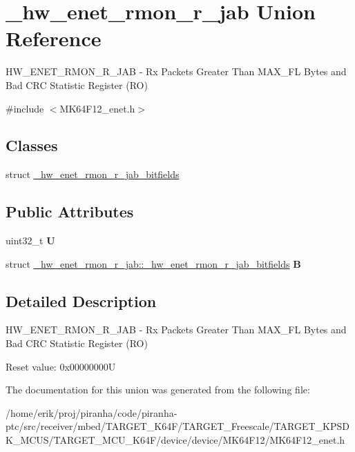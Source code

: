 \hypertarget{union__hw__enet__rmon__r__jab}{}\section{\+\_\+hw\+\_\+enet\+\_\+rmon\+\_\+r\+\_\+jab Union Reference}
\label{union__hw__enet__rmon__r__jab}


H\+W\+\_\+\+E\+N\+E\+T\+\_\+\+R\+M\+O\+N\+\_\+\+R\+\_\+\+J\+AB -\/ Rx Packets Greater Than M\+A\+X\+\_\+\+FL Bytes and Bad C\+RC Statistic Register (RO)  




{\ttfamily \#include $<$M\+K64\+F12\+\_\+enet.\+h$>$}

\subsection*{Classes}
\begin{DoxyCompactItemize}
\item 
struct \hyperlink{struct__hw__enet__rmon__r__jab_1_1__hw__enet__rmon__r__jab__bitfields}{\+\_\+hw\+\_\+enet\+\_\+rmon\+\_\+r\+\_\+jab\+\_\+bitfields}
\end{DoxyCompactItemize}
\subsection*{Public Attributes}
\begin{DoxyCompactItemize}
\item 
uint32\+\_\+t {\bfseries U}\hypertarget{union__hw__enet__rmon__r__jab_aba3c8ce7e114f7db6b4c817150dec4f1}{}\label{union__hw__enet__rmon__r__jab_aba3c8ce7e114f7db6b4c817150dec4f1}

\item 
struct \hyperlink{struct__hw__enet__rmon__r__jab_1_1__hw__enet__rmon__r__jab__bitfields}{\+\_\+hw\+\_\+enet\+\_\+rmon\+\_\+r\+\_\+jab\+::\+\_\+hw\+\_\+enet\+\_\+rmon\+\_\+r\+\_\+jab\+\_\+bitfields} {\bfseries B}\hypertarget{union__hw__enet__rmon__r__jab_a198b484dd7e446a74b02dad780f7c876}{}\label{union__hw__enet__rmon__r__jab_a198b484dd7e446a74b02dad780f7c876}

\end{DoxyCompactItemize}


\subsection{Detailed Description}
H\+W\+\_\+\+E\+N\+E\+T\+\_\+\+R\+M\+O\+N\+\_\+\+R\+\_\+\+J\+AB -\/ Rx Packets Greater Than M\+A\+X\+\_\+\+FL Bytes and Bad C\+RC Statistic Register (RO) 

Reset value\+: 0x00000000U 

The documentation for this union was generated from the following file\+:\begin{DoxyCompactItemize}
\item 
/home/erik/proj/piranha/code/piranha-\/ptc/src/receiver/mbed/\+T\+A\+R\+G\+E\+T\+\_\+\+K64\+F/\+T\+A\+R\+G\+E\+T\+\_\+\+Freescale/\+T\+A\+R\+G\+E\+T\+\_\+\+K\+P\+S\+D\+K\+\_\+\+M\+C\+U\+S/\+T\+A\+R\+G\+E\+T\+\_\+\+M\+C\+U\+\_\+\+K64\+F/device/device/\+M\+K64\+F12/M\+K64\+F12\+\_\+enet.\+h\end{DoxyCompactItemize}
